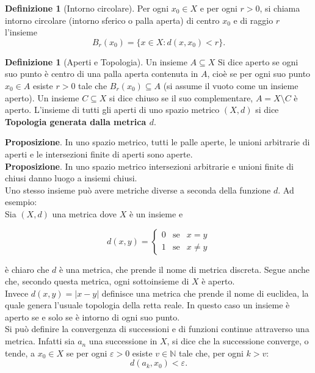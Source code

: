 \documentclass[a4paper,twoside]{article}
\renewcommand{\epsilon}{\varepsilon}
\newcommand{\N}{\mathbb{N}}
\theoremstyle{definition}
\newtheorem{definizione}[theorem]{Definizione}
\numberwithin{theorem}{section}
\begin{document}
\begin{definizione}[Intorno circolare]
Per ogni $x_0\in X$ e per ogni $r>0$, si chiama intorno circolare (intorno sferico o palla aperta) di centro $x_0$ e di raggio $r$ l'insieme $$B_r(x_0)=\{x\in X: d(x,x_0)<r\}.$$
\end{definizione}

\begin{definizione}[Aperti e Topologia]
Un insieme $A\subseteq X$ Si dice aperto se ogni suo punto è centro di una palla aperta contenuta in $A$, cioè se per ogni suo punto $x_0\in A$ esiste $r>0$ tale che $B_r(x_0)\subseteq A$ (si assume il vuoto come un insieme aperto). Un insieme $C\subseteq X$ si dice chiuso se il suo complementare, $A=X\setminus C$ è aperto. L'insieme di tutti gli aperti di uno spazio metrico $(X,d)$ si dice \textbf{Topologia generata dalla metrica $d$}.
\end{definizione}

\textbf{Proposizione}. In uno spazio metrico, tutti le palle aperte, le unioni arbitrarie di aperti e le intersezioni finite di aperti sono aperte.\\
\textbf{Proposizione}. In uno spazio metrico intersezioni arbitrarie e unioni finite di chiusi danno luogo a insiemi chiusi.\\

Uno stesso insieme può avere metriche diverse a seconda della funzione $d$. Ad esempio: \\
Sia $(X,d)$ una metrica dove $X$ è un insieme e

$$ d(x,y)=\left\{\begin{array}{ccl} 0 &\text{se} & x=y\\ 1 &\text{se} & x\neq y\end{array}\right. $$

è chiaro che $d$ è una metrica, che prende il nome di metrica discreta. Segue anche che, secondo questa metrica, ogni sottoinsieme di $X$ è aperto.\\
Invece $d(x,y)=|x-y|$ definisce una metrica che prende il nome di euclidea, la quale genera l'usuale topologia della retta reale. In questo caso un insieme è aperto se e solo se è intorno di ogni suo punto.\\
Si può definire la convergenza di successioni e di funzioni continue attraverso una metrica. Infatti sia $a_n$ una successione in $X$, si dice che la successione converge, o tende, a $x_0\in X$ se per ogni $\epsilon>0$ esiste $v\in \N$ tale che, per ogni $k>v$: \\
$$d(a_k,x_0)<\epsilon.$$
\end{document}
